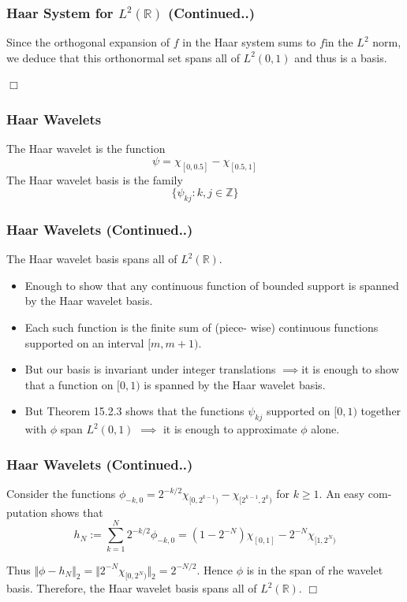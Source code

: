 \documentclass{beamer}
\newcommand{\qedwhite}{\hfill \ensuremath{\Box}}
\begin{document}
\begin{frame}
    \frametitle{Haar System for  $L^2\left({\mathbb{R}}\right)$ (Continued..)}
    Since the orthogonal expansion of $f$ in the Haar system sums to $f $in the $L^2$ norm,
we deduce that this orthonormal set spans all of $L^2(0,1)$ and thus is a basis.

\qedwhite

\end{frame}

\begin{frame}
\frametitle{Haar Wavelets}

\begin{definition}[15.2.4]
    The Haar wavelet is the function $$\psi = \chi_{[0, 0.5]} - \chi_{[0.5, 1]}$$
    The Haar wavelet basis is the family $$\{\psi_{kj}: k,j \in \mathbb{Z} \}$$
\end{definition}

\end{frame}

\begin{frame}
\frametitle{Haar Wavelets (Continued..)}

\begin{theorem}[15.2.5]
    The Haar wavelet basis spans all of $L^2(\mathbb{R})$.
\end{theorem}

\linebreak
\begin{itemize}
    \item Enough to show that any continuous function of bounded support is spanned by the Haar wavelet basis. 
    \item Each such function is the finite sum of (piece- wise) continuous functions supported on an interval $[m,m+1)$.
    \item But our basis is invariant under integer translations $\implies$it is enough to show that a function on $[0, 1)$ is spanned by the Haar wavelet basis.
    \item But Theorem 15.2.3 shows that the functions $\psi_{kj}$ supported on $[0,1)$ together with $\phi$ span $L^2(0,1)$ $\implies$ it is enough to approximate $\phi$ alone.
\end{itemize}    

\end{frame}

\begin{frame}
    \frametitle{Haar Wavelets (Continued..)}

    Consider the functions $\phi_{-k,0} = 2^{-k/2}\chi_{[0,2^{k-1})}-\chi_{[2^{k-1}, 2^k)}$ for $k \ge 1$. An easy com- putation shows that
    $$h_N := \sum_{k=1}^{N}2^{-k/2}\phi_{-k,0} = (1-2^{-N})\chi_{[0, 1]} - 2^{-N}\chi_{[1,2^N)}$$

        Thus $\Vert \phi - h_N \Vert_2 = \Vert 2^{-N}\chi_{[0,2^N)}\Vert_2 = 2^{-N/2}$. Hence $\phi$ is in the span of rhe wavelet
        basis. Therefore, the Haar wavelet basis spans all of $L^2(\mathbb{R})$.
        \qedwhite

    \end{frame}
\end{document}
